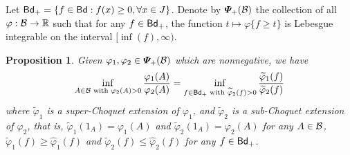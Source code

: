 \documentclass[12pt,a4paper]{article}
\newtheorem{prop}[theorem]{Proposition}
\begin{document}
Let ${\sf Bd}_+=\{f\in{\sf Bd}:f(x)\ge0,\forall x\in J\}$. Denote by $\bm{\varPsi}_+(\mathcal{B})$ the collection of all $\varphi:\mathcal{B}\to\mathbb{R}$ such that for any  $f\in{\sf Bd}_+$, the function $t\mapsto \varphi\{f\ge t\}$ is Lebesgue integrable on the interval $[\inf (f),\infty)$. 
\begin{prop}
Given $\varphi_1,\varphi_2\in\bm{\varPsi}_+(\mathcal{B})$ which are nonnegative, we have 
\begin{equation}\label{eq:Choquet-identity+}
\inf_{A\in\mathcal{B}\text{ with }\varphi_2(A)>0}\frac{\varphi_1(A)}{\varphi_2(A)}   =\inf_{f\in {\sf Bd}_+\text{ with }\widetilde{\varphi}_2(f)>0}\frac{\widetilde{\varphi}_1(f)}{\widetilde{\varphi}_2(f)}   
\end{equation}
where $\widetilde{\varphi}_1$ is a super-Choquet extension of $\varphi_1$, and $\widetilde{\varphi}_2$ is a sub-Choquet extension of $\varphi_2$, that is, $\widetilde{\varphi}_1(1_A)=\varphi_1(A)$ and $\widetilde{\varphi}_2(1_A)=\varphi_2(A)$ for any $A\in\mathcal{B}$,  $\widetilde{\varphi}_1(f)\ge \widehat{\varphi}_1(f)$ and $\widetilde{\varphi}_2(f)\le \widehat{\varphi}_2(f)$ for any $f\in{\sf Bd}_+$. 
\end{prop}
\end{document}
